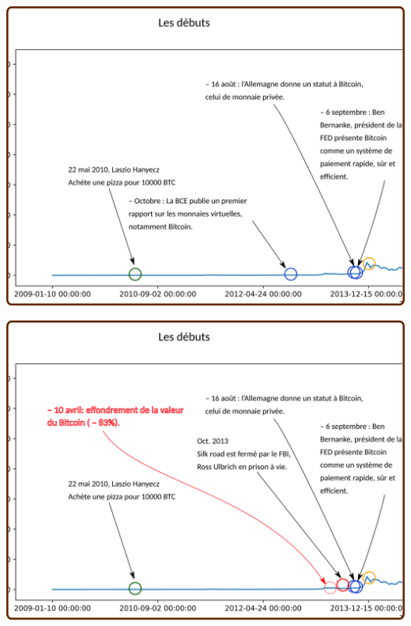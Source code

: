 \documentclass[presentation]{beamer}
\begin{document}
\begin{frame}[label={sec:org1288e27}]{}
\begin{center}
\includegraphics[width=.95\textwidth]{./Pictures/Timeline/12debut_FED.png}
\end{center}
\end{frame}

\begin{frame}[label={sec:org54a508b}]{}
\begin{center}
\includegraphics[width=.95\textwidth]{./Pictures/Timeline/13debut_realite.png}
\end{center}
\end{frame}
\end{document}
